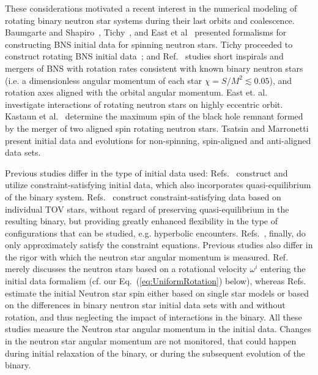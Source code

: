 \documentclass[aps,prd,amsmath,floatfix
,twocolumn
,superscriptaddress,nofootinbib,showpacs]{revtex4-1}
\theoremstyle{plain} \newtheorem{thm}{Theorem} \newtheorem{lem}{Lemma}
\newcommand{\red}[1]{\textcolor{Red}{#1}}
\begin{document}

These considerations motivated a recent interest in the numerical
modeling of rotating binary neutron star systems during their last
orbits and coalescence.  Baumgarte and
Shapiro~\cite{Baumgarte:2009fw}, Tichy~\cite{Tichy:2011gw}, and East
et al~\cite{East:2012zn} presented formalisms for constructing BNS
initial data for spinning neutron stars.  Tichy proceeded to construct
rotating BNS initial data~\cite{Tichy:2012rp}; and
Ref.~\cite{Bernuzzi:2013rza} studies short inspirals and mergers of
BNS with rotation rates consistent with known binary neutron stars
(i.e. a dimensionless angular momentum of each star
$\chi=S/M^2\lesssim 0.05$), and rotation axes aligned with the orbital
angular momentum.  East et. al.~\cite{East:2015yea} investigate
interactions of rotating neutron stars on highly eccentric orbit.
Kastaun et al.~\cite{Kastaun:2013mv} determine the maximum spin of the
black hole remnant formed by the merger of two aligned spin rotating
neutron stars.  Tsatsin and Marronetti~\cite{Tsatsin:2013jca} present
initial data and evolutions for non-spinning, spin-aligned and
anti-aligned data sets.  

Previous studies differ in the type of initial data used:
Refs.~\cite{Baumgarte:2009fw,Tichy:2011gw,Tichy:2012rp,Bernuzzi:2013rza}
construct and utilize constraint-satisfying initial data, which also
incorporates quasi-equilibrium of the binary system.
Refs.~\cite{East:2012zn,East:2015yea} construct constraint-satisfying
data based on individual TOV stars, without regard of preserving
quasi-equilibrium in the resulting binary, but providing greatly
enhanced flexibility in the type of configurations that can be
studied, e.g. hyperbolic encounters.
Refs.~\cite{Kastaun:2013mv,Tsatsin:2013jca}, finally, do only
approximately satisfy the constraint equations.  Previous studies also
differ in the rigor with which the neutron star angular momentum is
measured.  Ref.~\cite{Tichy:2012rp} merely discusses the neutron stars
based on a rotational velocity $\omega^i$ entering the initial data
formalism (cf. our Eq.~(\ref{eq:UniformRotation}) below), whereas
Refs.~\cite{Bernuzzi:2013rza,Kastaun:2013mv,East:2015yea} estimate the
initial Neutron star spin either based on single star models or based
on the differences in binary neutron star initial data sets with and
without rotation, and thus neglecting the impact of interactions in
the binary.  All these studies measure the Neutron star angular
momentum in the initial data.  Changes in the neutron star angular
momentum are not monitored, that could happen during initial
relaxation of the binary, or during the subsequent evolution of the
binary.
\end{document}
